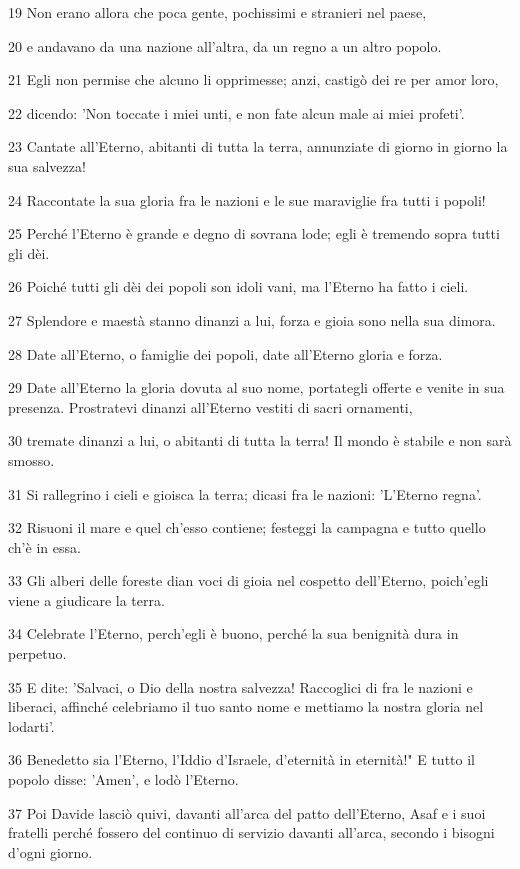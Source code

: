 \par 19 Non erano allora che poca gente, pochissimi e stranieri nel paese,
\par 20 e andavano da una nazione all'altra, da un regno a un altro popolo.
\par 21 Egli non permise che alcuno li opprimesse; anzi, castigò dei re per amor loro,
\par 22 dicendo: 'Non toccate i miei unti, e non fate alcun male ai miei profeti'.
\par 23 Cantate all'Eterno, abitanti di tutta la terra, annunziate di giorno in giorno la sua salvezza!
\par 24 Raccontate la sua gloria fra le nazioni e le sue maraviglie fra tutti i popoli!
\par 25 Perché l'Eterno è grande e degno di sovrana lode; egli è tremendo sopra tutti gli dèi.
\par 26 Poiché tutti gli dèi dei popoli son idoli vani, ma l'Eterno ha fatto i cieli.
\par 27 Splendore e maestà stanno dinanzi a lui, forza e gioia sono nella sua dimora.
\par 28 Date all'Eterno, o famiglie dei popoli, date all'Eterno gloria e forza.
\par 29 Date all'Eterno la gloria dovuta al suo nome, portategli offerte e venite in sua presenza. Prostratevi dinanzi all'Eterno vestiti di sacri ornamenti,
\par 30 tremate dinanzi a lui, o abitanti di tutta la terra! Il mondo è stabile e non sarà smosso.
\par 31 Si rallegrino i cieli e gioisca la terra; dicasi fra le nazioni: 'L'Eterno regna'.
\par 32 Risuoni il mare e quel ch'esso contiene; festeggi la campagna e tutto quello ch'è in essa.
\par 33 Gli alberi delle foreste dian voci di gioia nel cospetto dell'Eterno, poich'egli viene a giudicare la terra.
\par 34 Celebrate l'Eterno, perch'egli è buono, perché la sua benignità dura in perpetuo.
\par 35 E dite: 'Salvaci, o Dio della nostra salvezza! Raccoglici di fra le nazioni e liberaci, affinché celebriamo il tuo santo nome e mettiamo la nostra gloria nel lodarti'.
\par 36 Benedetto sia l'Eterno, l'Iddio d'Israele, d'eternità in eternità!" E tutto il popolo disse: 'Amen', e lodò l'Eterno.
\par 37 Poi Davide lasciò quivi, davanti all'arca del patto dell'Eterno, Asaf e i suoi fratelli perché fossero del continuo di servizio davanti all'arca, secondo i bisogni d'ogni giorno.
